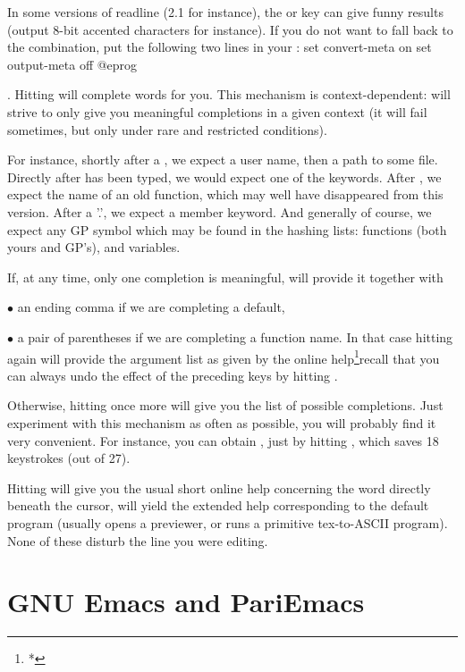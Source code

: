  In some versions of readline (2.1 for instance), the
 or  key can give funny results (output 8-bit accented
characters for instance). If you do not want to fall back to the 
combination, put the following two lines in your :
%
\bprog
  set convert-meta on
  set output-meta off
@eprog

 . Hitting
 will complete words for you. This mechanism is context-dependent:
 will strive to only give you meaningful completions in a given
context (it will fail sometimes, but only under rare and restricted
conditions).

  For instance, shortly after a \kbd{\til}, we expect a user name, then a
path to some file. Directly after  has been typed, we would
expect one of the  keywords. After  , we expect
the name of an old function, which may well have disappeared from this
version. After a '.', we expect a member keyword. And generally of course, we
expect any GP symbol which may be found in the hashing lists: functions (both
yours and GP's), and variables.

  If, at any time, only one completion is meaningful,  will provide it
together with

$\bullet$ an ending comma if we are completing a default,

$\bullet$ a pair of parentheses if we are completing a function name. In
that case hitting  again will provide the argument list as given
by the online help\footnote{*}{recall that you can always undo the effect
of the preceding keys by hitting }.

Otherwise, hitting  once more will give you the list of possible
completions. Just experiment with this mechanism as often as possible,
you will probably find it very convenient. For instance, you can obtain
, just by hitting ,
which saves 18 keystrokes (out of 27).

  Hitting  will give you the usual short online help concerning the
word directly beneath the cursor,  will yield the extended help
corresponding to the  default program (usually opens a 
previewer, or runs a primitive tex-to-ASCII program). None of these disturb
the line you were editing.

\section{GNU Emacs and PariEmacs}
\label{se:emacs}

